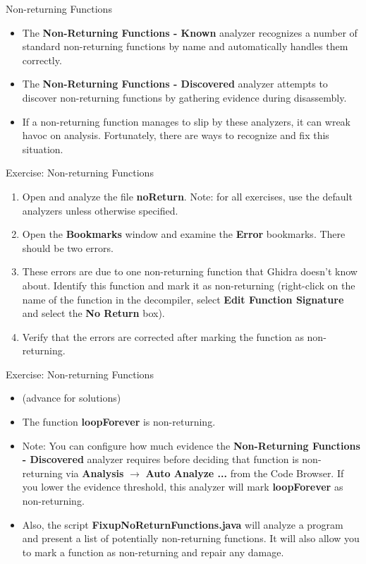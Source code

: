 \documentclass{beamer}
\begin{document}
\begin{frame}
\begin{block}{Non-returning Functions}
\begin{itemize}
\item The \textbf{Non-Returning Functions - Known} analyzer recognizes a number of standard non-returning functions by name and automatically handles them correctly.
\item The \textbf{Non-Returning Functions - Discovered} analyzer attempts to discover non-returning functions by gathering evidence during disassembly.
\item If a non-returning function manages to slip by these analyzers, it can wreak havoc on analysis.  Fortunately, there are ways to recognize and fix this situation.
\end{itemize}
\end{block}
\end{frame}

\begin{frame}
\begin{block}{Exercise: Non-returning Functions}
\begin{enumerate}
\item Open and analyze the file \textbf{noReturn}. Note: for all exercises, use the default analyzers unless otherwise specified.
\item Open the \textbf{Bookmarks} window and examine the \textbf{Error} bookmarks. There should be two errors.
\item These errors are due to one non-returning function that Ghidra doesn't know about.  Identify this function and mark it as non-returning (right-click on the name of the function in
the decompiler, select \textbf{Edit Function Signature} and select the \textbf{No Return} box).
\item Verify that the errors are corrected after marking the function as non-returning.
\end{enumerate}
\end{block}
\end{frame}

\begin{frame}
\begin{block}{Exercise: Non-returning Functions}
\begin{itemize}
\item[] (advance for solutions)
\pause
\item The function \textbf{loopForever} is non-returning.
\item Note: You can configure how much evidence the \textbf{Non-Returning Functions - Discovered} analyzer requires before deciding that function is non-returning via
\textbf{Analysis} $\rightarrow$ \textbf{Auto Analyze ...} from the Code Browser. If you lower the evidence threshold, this analyzer will mark \textbf{loopForever} as
non-returning.
\item Also, the script \textbf{FixupNoReturnFunctions.java} will analyze a program and present a list of potentially non-returning functions.
It will also allow you to mark a function as non-returning and repair any damage.
\end{itemize}
\end{block}
\end{frame}
\end{document}
